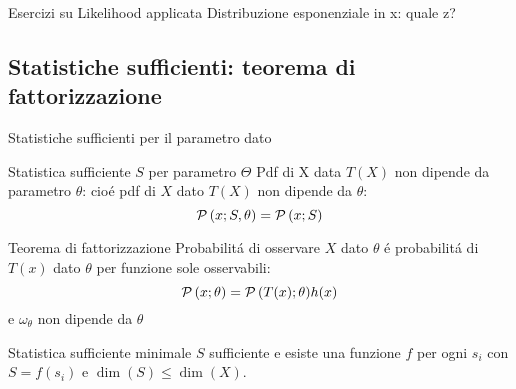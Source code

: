 \begin{frame}{Esercizi su Likelihood applicata}
Distribuzione esponenziale in x: quale z?
\end{frame}

\subsection{Statistiche sufficienti: teorema di fattorizzazione}

\begin{frame}{Statistiche sufficienti per il parametro dato}
\begin{block}{Statistica sufficiente $S$ per parametro $\Theta$}
Pdf di X data $T(X)$ non dipende da parametro $\theta$:
cio\'e pdf di $X$ dato $T(X)$ non dipende da $\theta$:
\[\operatorname{\mathcal{P}}{(x;S,\theta)}=\operatorname{\mathcal{P}}{(x;S)}\]
\end{block}
\begin{block}{Teorema di fattorizzazione}
Probabilit\'a di osservare $X$ dato $\theta$ \'e probabilit\'a di $T(x)$ dato $\theta$ per funzione sole osservabili: \[\operatorname{\mathcal{P}}{(x;\theta)}=\operatorname{\mathcal{P}}{(T(x);\theta)}h(x)\] e $\omega_{\theta}$ non dipende da $\theta$
\end{block}
\begin{block}{Statistica sufficiente minimale}
$S$ sufficiente e esiste una funzione $f$ per ogni $s_i$ con $S=f(s_i)$ e $\dim({S})\leq\dim{(X)}$.
\end{block}
\end{frame}

